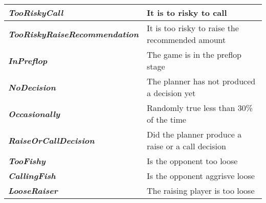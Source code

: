 \begin{tabular}{|l|l|}
    \textit{\textbf{TooRiskyCall}}                & It is to risky to call                                          \\ \hline
    \textit{\textbf{TooRiskyRaiseRecommendation}} & It is too risky to raise the recommended amount                 \\ \hline
    \textit{\textbf{InPreflop}}                   & The game is in the preflop stage                                \\ \hline
    \textit{\textbf{NoDecision}}                  & The planner has not produced a decision yet                     \\ \hline
    \textit{\textbf{Occasionally}}                & Randomly true less than 30\% of the time                        \\ \hline
    \textit{\textbf{RaiseOrCallDecision}}         & Did the planner produce a raise or a call decision              \\ \hline
    \textit{\textbf{TooFishy}}                    & Is the opponent too loose                                       \\ \hline
    \textit{\textbf{CallingFish}}                 & Is the opponent aggrisve loose                                  \\ \hline
    \textit{\textbf{LooseRaiser}}                 & The raising player is too loose                                 \\ \hline
    \end{tabular}
